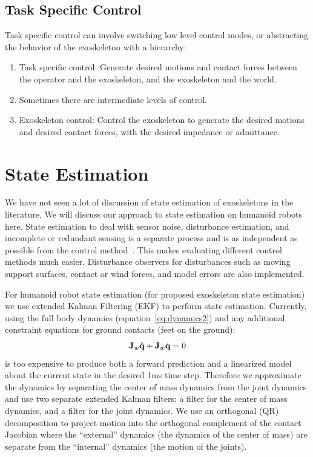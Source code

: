 \documentclass[letterpaper,12pt,fullpage]{article}
\begin{document}
\subsection{Task Specific Control}

Task specific control can involve switching low level control modes, or abstracting
the behavior of the exoskeleton with a hierarchy:
\begin{enumerate}
\item
Task specific control: Generate desired motions and contact forces between
the operator and the exoskeleton, and the exoskeleton and the world.
\item
Sometimes there are intermediate levels of control.
\item
Exoskeleton control: Control the exoskeleton to generate the desired motions and
desired contact forces, with the desired impedance or admittance.
\end{enumerate}

\section{State Estimation}

We have not seen a lot of discussion of state estimation of exoskeletons in
the literature.
We will discuss our approach to state estimation on humanoid robots here.
State estimation to deal with sensor noise,
disturbance estimation, and incomplete or
redundant sensing is a separate process and is as independent as possible
from the control method~\cite{certainty-eq,separation-prin}.
This makes evaluating different control methods much easier.
Disturbance observers for disturbances such as
moving support surfaces, contact or wind forces, and model errors
are also implemented.

For humanoid robot state estimation (for proposed exoskeleton state estimation)
we use extended Kalman Filtering (EKF) to perform state estimation.
Currently, using the full body dynamics (equation~\ref{eq:dynamics2})
and any additional constraint equations for ground contacts (feet on the ground):
\begin{equation}
{\bf J}_w \ddot{{\bf q}} + \dot{{\bf J}}_w \dot{{\bf q}} = 0
\end{equation}
is too expensive to produce both a forward prediction and a linearized model
about the current state in the desired 1ms time step.
Therefore we approximate the dynamics by separating the center of mass dynamics
from the joint dynamics and use two separate extended Kalman filters:
a filter for the center of mass dynamics, and a filter for the joint dynamics.
We use an orthogonal (QR) decomposition to project motion into the orthogonal
complement of the contact Jacobian where the ``external'' dynamics (the dynamics
of the center of mass) are separate from the ``internal'' dynamics (the motion
of the joints).
\end{document}
